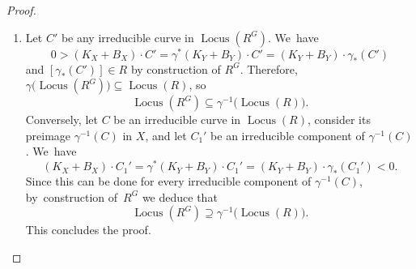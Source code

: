 \documentclass[10pt]{amsart}
\theoremstyle{plain}
\theoremstyle{definition}
\DeclareMathOperator{\Locus}{Locus}
\begin{document}
\begin{proof}
\begin{enumerate}
Suppose now that the ray $R$ is spanned by the class of an irreducible curve $C$ in~$Y$. Let $C'$ be an irreducible curve in $X$ mapping onto $C$. Then the class $\beta$ of the $1$\nobreakdash-cycle $\sum_{g \in G} g(C')$ is $G$\nobreakdash-invariant and maps to an element of $R$ under $\gamma_*$. Thus, by~the argument above, $\beta$ spans the extremal ray $R^G$ constructed above.

\item
Let $C'$ be any irreducible curve in $\Locus \left(R^G \right)$. We~have
\[
0 > (K_X+B_X) \cdot C' = \gamma^*(K_Y+B_Y) \cdot C' =(K_Y+B_Y) \cdot \gamma_*(C')
\]
and $[\gamma_* (C')] \in R$ by construction of $R^G$.
Therefore, $\gamma\bigl(\Locus(R^G) \bigr) \subseteq \Locus(R)$, so~\[
\Locus \left(R^G \right) \subseteq \gamma^{-1} \bigl(\Locus(R) \bigr).
\]
Conversely, let $C$ be an irreducible curve in $\Locus(R)$, consider its preimage $\gamma^{-1}(C)$ in $X$, and let $C_1'$ be an irreducible component of $\gamma^{-1}(C)$. We~have
\[
(K_X+B_X) \cdot C_1' = \gamma^*(K_Y+B_Y) \cdot C_1' = (K_Y+B_Y) \cdot \gamma_*(C_1') < 0.
\]
Since this can be done for every irreducible component of $\gamma^{-1}(C)$, by~construction of~$R^G$ we deduce that
\[
\Locus \left(R^G \right) \supseteq \gamma^{-1} \bigl(\Locus(R) \bigr).
\]
This concludes the proof.\qedhere
\end{enumerate}
\end{proof}
\end{document}
